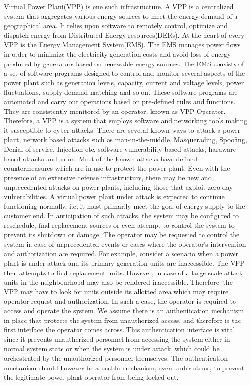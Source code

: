 
Virtual Power Plant(VPP) is one such infrastructure. A VPP is a centralized system that aggregates various energy sources to meet the energy demand of a geographical area. It relies upon software to remotely control, optimize and dispatch energy from Distributed Energy resources(DERs). At the heart of every VPP is the Energy Management System(EMS). The EMS manages power flows in order to minimize the electricity generation costs and avoid loss of energy produced by generators based on renewable energy sources. The EMS consists of a set of software programs designed to control and monitor several aspects of the power plant such as generation levels, capacity, current and voltage levels, power fluctuations, supply-demand matching and so on. These software programs are automated and carry out operations based on pre-defined rules and functions. They are consistently monitored by an operator, known as VPP Operator. Therefore, a VPP is a system that employs software and networking tools making it susceptible to cyber attacks. There are several known ways to attack a power plant, network based attacks such as man-in-the-middle, Masquerading, Spoofing, Denial of service, Injection etc, software vulnerability based attacks, hardware based attacks and so on. Most of the known attacks have defined countermeasures which are in use to protect the power plant. Even with the presence of an extensive defense infrastructure, there may be new and unprecedented attacks on power plants, including those that exploit zero-day vulnerabilities. 
\newline
A virtual power plant under attack is expected to continue functioning normally, i.e, it must primarily meet the goal of energy supply to the customer end. In anticipation of such attacks, the system may be configured to reschedule, find replacement sources or even attempt to control the system to prevent its shutdown or damage. The operator may be requested to control the system in case of unprecedented events or cases where the operator's intervention and authorization are required. For example, consider a scenario when a power plant is under attack and its primary generation units are inaccessible. The VPP then attempts to find replacement units. However, in case of a large scale attack units in the neighbourhood may also be rendered inaccessible. Therefore, the VPP may have to look for units outside its allotted area which may require operator request and authorization. In such a case, the operator is required to access and operate the system. We assume there is an authentication mechanism in place that protects the system from unauthorized access, and therefore is the first interface the operator comes across. This authentication interface is vital since it prevents unauthorized personnel from accessing the system either in normal system state or when the system is under attack, which could be orchestrated by the unauthorized personnel themselves. The authentication mechanism should however be a usable mechanism, even under stress, to prevent the legitimate power plant operator from being locked out. 

